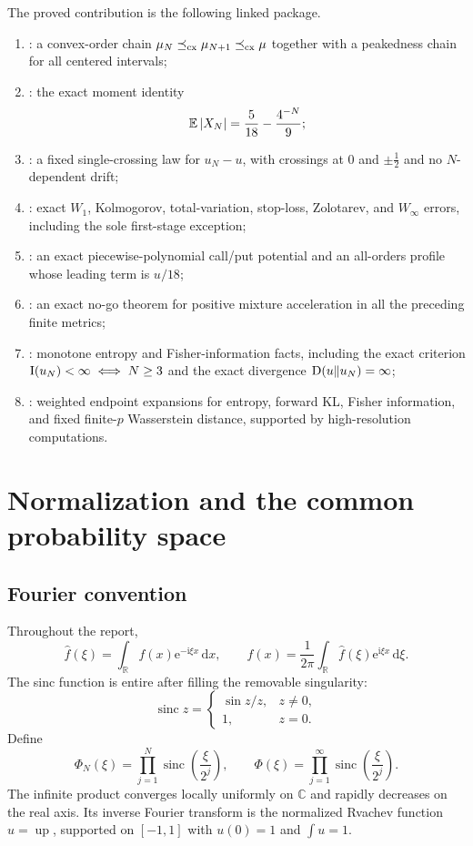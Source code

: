 \documentclass[11pt,oneside]{article}
\numberwithin{equation}{section}
\theoremstyle{definition}
\theoremstyle{remark}
\newcommand{\R}{\mathbb R}
\newcommand{\C}{\mathbb C}
\newcommand{\E}{\mathbb E}
\newcommand{\Up}{\operatorname{up}}
\newcommand{\sinc}{\operatorname{sinc}}
\newcommand{\dd}{\,\mathrm d}
\newcommand{\e}{\mathrm e}
\newcommand{\ii}{\mathrm i}
\begin{document}
The proved contribution is the following linked package.

\begin{enumerate}
\item \newresult: a convex-order chain $\mu_N\preceq_{\rm cx}\mu_{N+1}\preceq_{\rm cx}\mu$ together with a peakedness chain for all centered intervals;
\item \newresult: the exact moment identity
\[
 \E\abs{X_N}=\frac5{18}-\frac{4^{-N}}9;
\]
\item \newresult: a fixed single-crossing law for $u_N-u$, with crossings at $0$ and $\pm\tfrac12$ and no $N$-dependent drift;
\item \newresult: exact $W_1$, Kolmogorov, total-variation, stop-loss, Zolotarev, and $W_\infty$ errors, including the sole first-stage exception;
\item \newresult: an exact piecewise-polynomial call/put potential and an all-orders profile whose leading term is $u/18$;
\item \newresult: an exact no-go theorem for positive mixture acceleration in all the preceding finite metrics;
\item \newresult: monotone entropy and Fisher-information facts, including the exact criterion $\operatorname{I}(u_N)<\infty\iff N\ge3$ and the exact divergence $\operatorname{D}(u\Vert u_N)=\infty$;
\item \conjstatus: weighted endpoint expansions for entropy, forward KL, Fisher information, and fixed finite-$p$ Wasserstein distance, supported by high-resolution computations.
\end{enumerate}

\section{Normalization and the common probability space}
\label{p5:sec:model}

\subsection{Fourier convention}

Throughout the report,
\begin{equation}
 \widehat f(\xi)=\int_{\R}f(x)\e^{-\ii\xi x}\dd x,
 \qquad
 f(x)=\frac1{2\pi}\int_{\R}\widehat f(\xi)\e^{\ii\xi x}\dd\xi.
 \label{p5:eq:fourier}
\end{equation}
The sinc function is entire after filling the removable singularity:
\[
 \sinc z=\begin{cases}\sin z/z,&z\ne0,\\1,&z=0.\end{cases}
\]
Define
\begin{equation}
 \Phi_N(\xi)=\prod_{j=1}^{N}\sinc\!\left(\frac{\xi}{2^j}\right),
 \qquad
 \Phi(\xi)=\prod_{j=1}^{\infty}\sinc\!\left(\frac{\xi}{2^j}\right).
 \label{p5:eq:products}
\end{equation}
The infinite product converges locally uniformly on $\C$ and rapidly decreases on the real axis.  Its inverse Fourier transform is the normalized Rvachev function $u=\Up$, supported on $[-1,1]$ with $u(0)=1$ and $\int u=1$.
\end{document}
